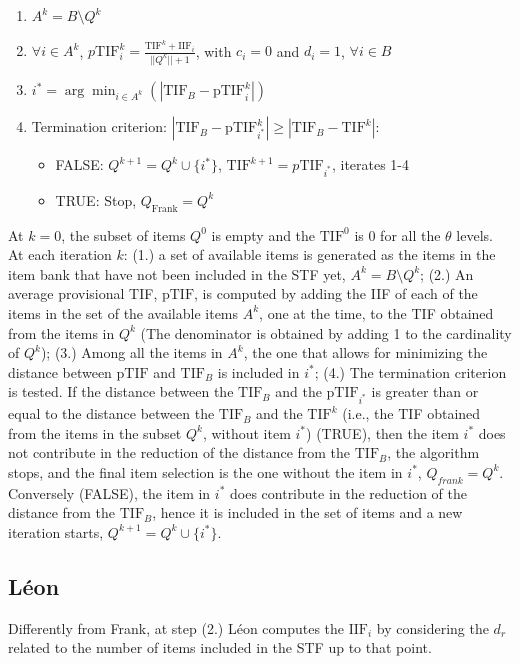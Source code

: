 \documentclass{svproc}
\begin{document}
\begin{enumerate}
	\item  $A^k = B \setminus Q^k$ 
	\item $\forall i \in A^k$, $p\text{TIF}_{i}^k = \frac{\text{TIF}^k + \text{IIF}_{i}}{||Q^k||+1}$, with $c_i = 0$ and $d_i = 1$, $\forall i \in B$
	\item $i^* = \arg \min_{i \in A^k} (|\text{TIF}_B - \text{pTIF}_i^k|)$
	\item Termination criterion: $|\text{TIF}_B - \text{pTIF}_{i^*}^k| \geq |\text{TIF}_B - \text{TIF}^{k}|$: 
	\begin{itemize}
		\item FALSE:  $Q^{k+1} = Q^{k} \cup \{i^*\}$, $\text{TIF}^{k+1} = p\text{TIF}_{i^*}$, iterates 1-4 
		\item TRUE: Stop, %
		$Q_{\text{Frank}} = Q^k$
		
	\end{itemize}
\end{enumerate}
At $k = 0$, the subset of items $Q^0$ is empty and the $\text{TIF}^0$ is 0 for all the $\theta$ levels. 
At each iteration $k$: (1.) a set of available items is generated as the items in the item bank that have not been included in the STF yet, $A^k = B \setminus Q^k$; (2.)
An average provisional TIF, $\text{pTIF}$, is computed by adding the IIF of each of the items in the set of the available items $A^k$, one at the time, to the TIF obtained from the items in $Q^k$ (The denominator is obtained by adding 1 to the cardinality of $Q^k$); (3.) Among all the items in $A^k$, the one that allows for minimizing the distance between $\text{pTIF}$ and $\text{TIF}_B$ is included in $i^*$; (4.) 
The termination criterion is tested. 
If the distance between the $\text{TIF}_B$ and the $\text{pTIF}_{i^*}$ is greater than or equal to the distance between the $\text{TIF}_B$ and the $\text{TIF}^k$ (i.e., the TIF obtained from the items in the subset $Q^k$, without item $i^*$) (TRUE), then the item $i^*$ does not contribute in the reduction of the distance from the $\text{TIF}_B$, the algorithm stops, and the final item selection is the one without the item in $i^*$, $Q_{frank} = Q^k$. Conversely (FALSE), the item in $i^*$ does contribute in the reduction of the distance from the $\text{TIF}_B$, hence it is included in the set of items and a new iteration starts, $Q^{k+1} = Q^k \cup \{i^*\}$.

\color{blue}
\subsection{Léon}
Differently from Frank, at step (2.) Léon computes the $\text{IIF}_i$ by considering the $d_r$ related to the number of items included in the STF up to that point.  
\normalcolor
\end{document}
